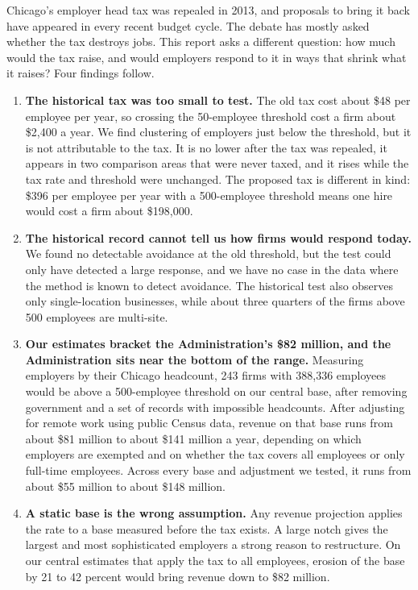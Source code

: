 \documentclass[12pt,letterpaper]{article}
\begin{document}
Chicago's employer head tax was repealed in 2013, and proposals to bring it back have appeared in every recent budget cycle. The debate has mostly asked whether the tax destroys jobs. This report asks a different question: how much would the tax raise, and would employers respond to it in ways that shrink what it raises? Four findings follow.

\begin{enumerate}[leftmargin=*]
\item \textbf{The historical tax was too small to test.} The old tax cost about \$48 per employee per year, so crossing the 50-employee threshold cost a firm about \$2,400 a year. We find clustering of employers just below the threshold, but it is not attributable to the tax. It is no lower after the tax was repealed, it appears in two comparison areas that were never taxed, and it rises while the tax rate and threshold were unchanged. The proposed tax is different in kind: \$396 per employee per year with a 500-employee threshold means one hire would cost a firm about \$198,000.

\item \textbf{The historical record cannot tell us how firms would respond today.} We found no detectable avoidance at the old threshold, but the test could only have detected a large response, and we have no case in the data where the method is known to detect avoidance. The historical test also observes only single-location businesses, while about three quarters of the firms above 500 employees are multi-site.

\item \textbf{Our estimates bracket the Administration's \$82 million, and the Administration sits near the bottom of the range.} Measuring employers by their Chicago headcount, 243 firms with 388,336 employees would be above a 500-employee threshold on our central base, after removing government and a set of records with impossible headcounts. After adjusting for remote work using public Census data, revenue on that base runs from about \$81 million to about \$141 million a year, depending on which employers are exempted and on whether the tax covers all employees or only full-time employees. Across every base and adjustment we tested, it runs from about \$55 million to about \$148 million.

\item \textbf{A static base is the wrong assumption.} Any revenue projection applies the rate to a base measured before the tax exists. A large notch gives the largest and most sophisticated employers a strong reason to restructure. On our central estimates that apply the tax to all employees, erosion of the base by 21 to 42 percent would bring revenue down to \$82 million.
\end{enumerate}
\end{document}
